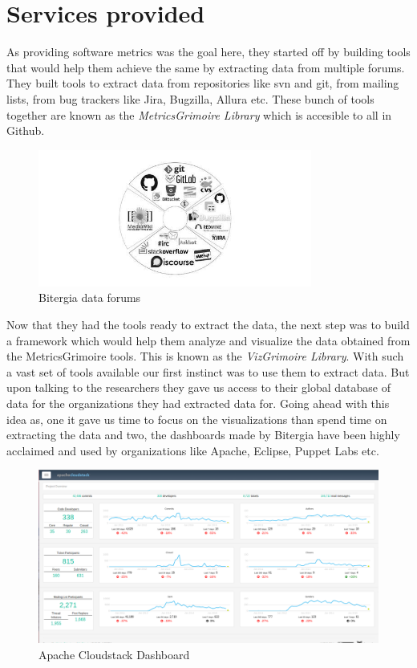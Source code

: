 \documentclass[seploa]{beavtex}
\begin{document}
\section{Services provided}
As providing software metrics was the goal here, they started off by building tools that would help them achieve the same by extracting data from multiple forums. They built tools to extract data from repositories like svn and git, from mailing lists, from bug trackers like Jira, Bugzilla, Allura etc. These bunch of tools together are known as the \emph{MetricsGrimoire Library} which is accesible to all in Github.

\begin{figure}[!ht]
\centering
\includegraphics[width=90mm]{bitergia.jpg}
\caption{Bitergia data forums}
\end{figure}

Now that they had the tools ready to extract the data, the next step was to build a framework which would help them analyze and visualize the data obtained from the MetricsGrimoire tools. This is known as the \emph{VizGrimoire Library}. With such a vast set of tools available our first instinct was to use them to extract data. But upon talking to the researchers they gave us access to their global database of data for the organizations they had extracted data for. Going ahead with this idea as, one it gave us time to focus on the visualizations than spend time on extracting the data and two, the dashboards made by Bitergia have been highly acclaimed and used by organizations like Apache, Eclipse, Puppet Labs etc.

\begin{figure}[H]
\centering
\includegraphics[width=120mm]{apache.png}
\caption{Apache Cloudstack Dashboard}
\end{figure}
\end{document}

